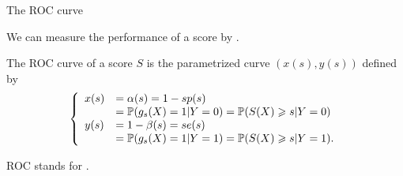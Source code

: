 \documentclass[xcolor={usenames,dvipsnames},handout]{beamer}
\newtheorem{remark}[theorem]{Remark}
\begin{document}
\begin{frame}[allowframebreaks]{The ROC curve}


We can measure the performance of a score by .

\vspace{.3cm}

\begin{definition}
The ROC curve of a score $S$ is the parametrized curve $(x(s), y(s))$ defined by
$$
\left\{
\begin{array}{ll}
x(s) &= \alpha(s) = 1-sp(s) \\
	&=  \P (g_s(X) = 1 | Y=0) = \P ( S(X)\geq s| Y=0) \\
y(s) &= 1-\beta(s) = se(s) \\
	&= \P (g_s(X) = 1 | Y=1) =\P (S(X) \geq s | Y=1) .
\end{array}
\right.
$$
\end{definition}

\vspace{.3cm}

 ROC stands for .



%

\end{frame}
\end{document}
